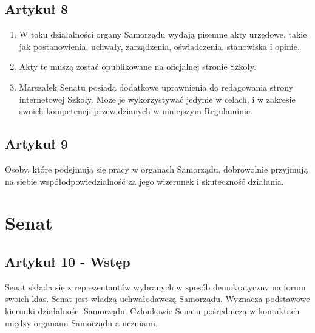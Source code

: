 \documentclass[14pt]{article}
\newenvironment{ustepy}{%
	\begin{enumerate}[leftmargin=1.5em, itemindent=1pt, labelwidth=1em, itemsep=5pt]
	}{%
	\end{enumerate}
}
\begin{document}
\subsection*{Artykuł 8}
\begin{ustepy}
\item W toku działalności organy Samorządu wydają pisemne akty urzędowe, takie jak postanowienia, uchwały, zarządzenia, oświadczenia, stanowiska i opinie.
\item Akty te muszą zostać opublikowane na oficjalnej stronie Szkoły. 
\item Marszałek Senatu posiada dodatkowe uprawnienia do redagowania strony internetowej Szkoły. Może je wykorzystywać jedynie w celach, i w zakresie swoich kompetencji przewidzianych w niniejszym Regulaminie.
\end{ustepy}

\subsection*{Artykuł 9}
Osoby, które podejmują się pracy w organach Samorządu, dobrowolnie przyjmują na siebie współodpowiedzialność za jego wizerunek i skuteczność działania. 
\section{Senat}
\subsection*{Artykuł 10 - Wstęp}
Senat składa się z reprezentantów wybranych w sposób demokratyczny na forum swoich klas. Senat jest władzą uchwałodawczą Samorządu. Wyznacza podstawowe kierunki działalności Samorządu. Członkowie Senatu pośredniczą w kontaktach między organami Samorządu a uczniami.
\end{document}
